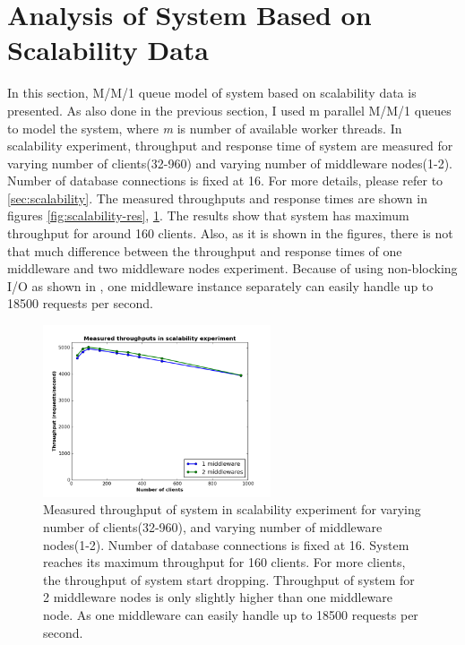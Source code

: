 \documentclass[11pt]{article}
\begin{document}
\section{Analysis of System Based on Scalability Data}\label{sec:analysis-scalability}

In this section, M/M/1 queue model of system based on scalability data is presented.
As also done in the previous section, I used m parallel M/M/1 queues to model the system, 
where \emph{m} is number of available worker threads. In scalability experiment, 
throughput and response time of system are measured for varying number of clients(32-960) 
and varying number of middleware nodes(1-2). Number of database connections is fixed at 16.
For more details, please refer to \cref{sec:scalability}.
The measured throughputs and response times are shown in figures \ref{fig:scalability-res}, \ref{fig:scalability-thr}. 
The results show that system has maximum throughput for around 160 clients. Also, as it is 
shown in the figures, there is not that much difference between the throughput and response times of one middleware 
and two middleware nodes experiment. Because of using non-blocking I/O as shown in \cite[section~1.2.4]{ms1}, 
one middleware instance separately can easily handle up to 18500 requests per second.

\begin{figure}[H]
  \includegraphics[width=0.6\textwidth,page=1]{figures/mm1/scalability-new/throughput}
  \centering
  \caption{Measured throughput of system in scalability experiment for varying number of clients(32-960), and varying
  number of middleware nodes(1-2). Number of database connections is fixed at 16. System reaches its maximum throughput
  for 160 clients. For more clients, the throughput of system start dropping. Throughput of system for 2 middleware 
  nodes is only slightly higher than one middleware node. As one middleware can easily handle up to 18500 requests 
  per second.}
  \label{fig:scalability-thr}
\end{figure}
\end{document}
